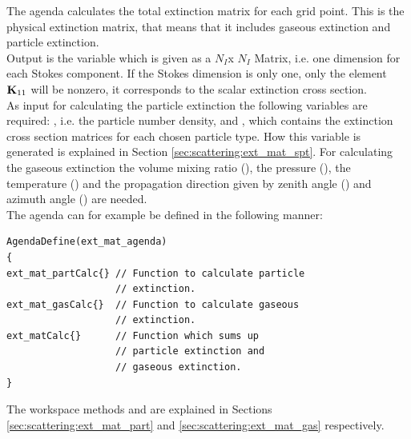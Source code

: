 \label{sec:scattering:ext_mat_agenda}

The agenda  calculates the total extinction
matrix \ExtMat{}
for each grid point. This is the physical extinction matrix, that means
that it includes gaseous extinction and particle
extinction.\\
Output is the variable  which is given
as a $N_I$x $N_I$ Matrix, i.e. one dimension for each Stokes component. If the
Stokes dimension is only one, only the element ${\bf K}_{11}$ will be
nonzero, it corresponds to the scalar extinction cross section. \\
As input for calculating the particle extinction the following
variables are required:
, i.e. the particle number density, and 
, which contains the extinction cross section
matrices for each chosen particle type. How this variable is generated
is explained in Section \ref{sec:scattering:ext_mat_spt}. For calculating the
gaseous extinction the volume mixing ratio (), the
pressure (), the temperature  () and the
propagation direction given by zenith angle () and
azimuth angle () are needed.\\
The agenda can for example be defined in the following manner:

\vspace{1ex}
\begin{minipage}{0.9\hsize}
\begin{verbatim}
AgendaDefine(ext_mat_agenda)
{
ext_mat_partCalc{} // Function to calculate particle
                   // extinction.
ext_mat_gasCalc{}  // Function to calculate gaseous
                   // extinction. 
ext_matCalc{}      // Function which sums up
                   // particle extinction and 
                   // gaseous extinction.
}
\end{verbatim}
\end{minipage}

\vspace{2ex}
\noindent
The workspace methods  and
 are explained in Sections
\ref{sec:scattering:ext_mat_part} and \ref{sec:scattering:ext_mat_gas}
respectively.

\label{sec:scattering:ext_mat_part}

